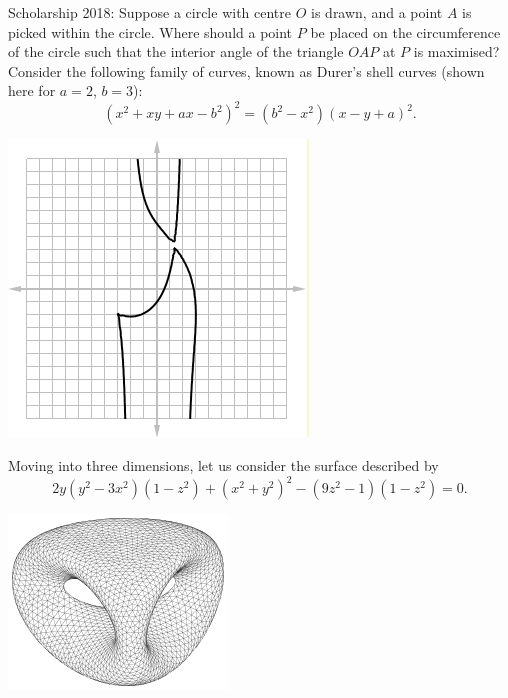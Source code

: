 \begin{questions}
  \questioS Scholarship 2018: Suppose a circle with centre $ O $ is drawn, and a point $ A $ is picked within the circle. Where should a point $ P $ be
            placed on the circumference of the circle such that the interior angle of the triangle $ OAP $ at $ P $ is maximised?
  \clearpage
  \questioS Consider the following family of curves, known as Durer's shell curves (shown here for $ a = 2 $, $ b = 3 $):
            \begin{displaymath}
              (x^2 + xy + ax - b^2)^2 = (b^2 - x^2)(x - y + a)^2.
            \end{displaymath}
            \begin{center}
              \includegraphics[width=0.3\linewidth]{durer}
            \end{center}
  \questioO Moving into three dimensions, let us consider the surface described by
            \begin{displaymath}
              2y(y^2 - 3x^2)(1 - z^2) + (x^2 + y^2)^2 - (9z^2 - 1)(1 - z^2) = 0.
            \end{displaymath}
            \begin{center}
              \includegraphics[width=0.3\linewidth]{impsurface}
            \end{center}
    \begin{parts}

\end{parts}
\end{questions}
